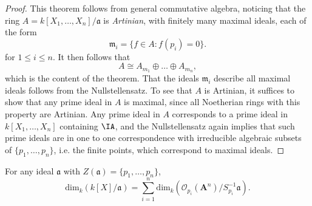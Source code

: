 \begin{proof}
    This theorem follows from general commutative algebra, noticing that the ring $A = k[X_1,\dots,X_n] / \mathfrak{a}$ is \emph{Artinian}, with finitely many maximal ideals, each of the form
    \[ \mathfrak{m}_i = \{ f \in A : f(p_i) = 0 \}. \]
    for $1 \leq i \leq n$. It then follows that
    \[ A \cong A_{m_1} \oplus \dots \oplus A_{m_n}, \]
    which is the content of the theorem. That the ideals $\mathfrak{m}_i$ describe all maximal ideals follows from the Nullstellensatz. To see that $A$ is Artinian, it suffices to show that any prime ideal in $A$ is maximal, since all Noetherian rings with this property are Artinian. Any prime ideal in $A$ corresponds to a prime ideal in $k[X_1,\dots,X_n]$ containing $\IA$, and the Nullstellensatz again implies that such prime ideals are in one to one correspondence with irreducible algebraic subsets of $\{ p_1,\dots,p_n \}$, i.e. the finite points, which correspond to maximal ideals.
\end{proof}

\begin{corollary}
    For any ideal $\mathfrak{a}$ with $Z(\mathfrak{a}) = \{ p_1,\dots, p_n \}$,
    \[ \text{dim}_k(k[X]/\mathfrak{a}) = \sum_{i = 1}^n \text{dim}_k(\mathcal{O}_{p_i}(\mathbf{A}^n)/S_{p_i}^{-1} \mathfrak{a}). \]
\end{corollary}


